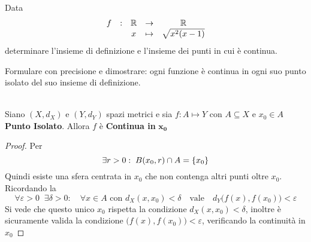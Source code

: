 \begin{exercise}
	Data
	\[\begin{array}{ccccc} {f} & : & {\mathbb{R}} & \to & {\mathbb{R}} \\ & & {x} & \mapsto & {\sqrt{x^2(x-1)}} \\ \end{array}\]
	determinare l'insieme di definizione e l'insieme dei punti in cui è continua.
\end{exercise}
\begin{exercise}
	\label{ex:f_cont_in_pto_isol}
	Formulare con precisione e dimostrare: ogni funzione è continua in ogni suo punto isolato del suo insieme di definizione.
	\begin{solution}\hfill\\
		\renewcommand\qedsymbol{$\square$} %
		Siano $(X,d_X)$ e $(Y,d_Y)$ spazi metrici e sia $f: A \mapsto Y$ con $A \subseteq X$ e $x_0 \in A$ \textbf{Punto Isolato}. Allora $f$ è \textbf{Continua in} $\boldsymbol{x_0}$
		\begin{proof}
			\let\qed\relax %
			Per 
			\[\exists r > 0:\; B(x_0, r) \cap A = \left\{x_0\right\}\]
			Quindi esiste una sfera centrata in $x_0$ che non contenga altri punti oltre $x_0$.
			Ricordando la 
			\[\forall \varepsilon > 0\;\;\exists \delta > 0:\quad \forall x \in A \text{ con } d_X(x,x_0)<\delta \quad \text{vale} \quad d_Y \bigl(f(x),f(x_0)\bigr) < \varepsilon\]
			Si vede che questo unico $x_0$ rispetta la condizione $d_X(x,x_0)<\delta$, inoltre è sicuramente valida la condizione $\bigl(f(x),f(x_0)\bigr) < \varepsilon$, verificando la continuità in $x_0$
		\end{proof}
	\end{solution}
\end{exercise}

